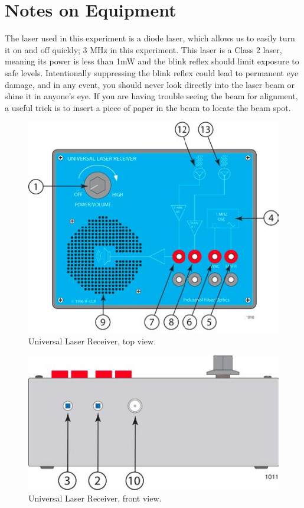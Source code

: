 \section{Notes on Equipment}

The laser used in this experiment is a diode laser, which allows us to easily turn it on and off quickly; 3 MHz in this experiment.  This laser is a Class 2 laser, meaning its power is less than 1mW and the blink reflex should limit exposure to safe levels.  Intentionally suppressing the blink reflex could lead to permanent eye damage, and in any event, you should never look directly into the laser beam or shine it in anyone's eye.  If you are having trouble seeing the beam for alignment, a useful trick is to insert a piece of paper in the beam to locate the beam spot.

\begin{figure}
\centering
\includegraphics{../images/if-lsl-sa1opman-revd.jpg}
\caption{Universal Laser Receiver, top view.}
\label{ULRtop}
\end{figure}

\begin{figure}
\centering
\includegraphics{../images/if-lsl-sa1opman-revdfront.jpg}
\caption{Universal Laser Receiver, front view.}
\label{ULRfront}
\end{figure}

